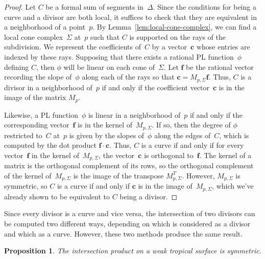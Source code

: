\documentclass[11pt]{amsart}
\newtheorem{prop}[thm]{Proposition}
\theoremstyle{definition}
\newcommand{\bff}{\mathbf f}
\begin{document}
\begin{proof}
Let $C$ be a formal sum of segments in~$\Delta$. Since the conditions for being
a curve and a divisor are both local, it suffices to check that they are
equivalent in a neighborhood of a point~$p$. By
Lemma~\ref{lem:local-cone-complex}, we can find a local cone complex~$\Sigma$
at~$p$ such that $C$ is supported on the rays of the subdivision. We represent
the coefficients of~$C$ by a vector~$\mathbf c$ whose entries are indexed by
these rays. Supposing that there exists a rational PL function~$\phi$ defining
$C$, then $\phi$ will be linear on each cone of~$\Sigma$. Let $\bff$ be the rational vector
recording the slope of~$\phi$ along each of the rays so that $\mathbf c =
M_{p,\Sigma} \bff$. Thus, $C$ is a divisor in a neighborhood of~$p$ if and only
if the coefficient vector~$\mathbf c$ is in the image of the matrix $M_p$.

Likewise, a PL function~$\phi$ is linear in a neighborhood of~$p$ if and only if
the corresponding vector~$\bff$ is in the kernel of~$M_{p,\Sigma}$. If so, then
the degree of $\phi$ restricted to~$C$ at~$p$ is given by the slopes of~$\phi$
along the edges of~$C$, which is computed by the dot product $\bff \cdot \mathbf
c$. Thus, $C$ is a curve if and only if for every vector~$\bff$ in the kernel
of~$M_{p,\Sigma}$, the vector~$\mathbf c$ is orthogonal to~$\bff$. The kernel of
a matrix is the orthogonal complement of its rows, so the orthogonal complement
of the kernel of~$M_{p,\Sigma}$ is the image of the transpose $M_{p,\Sigma}^T$.
However, $M_{p,\Sigma}$ is symmetric, so $C$ is a curve if and only if $\mathbf
c$ is in the image of~$M_{p,\Sigma}$, which we've already shown to be equivalent
to $C$ being a divisor.
\end{proof}

Since every divisor is a curve and vice versa, the intersection of two divisors
can be computed two different ways, depending on which is considered as a
divisor and which as a curve. However, these two methods produce the same
result.

\begin{prop}\label{prop:intersection-sym}
The intersection product on a weak tropical surface is symmetric.
\end{prop}
\end{document}
